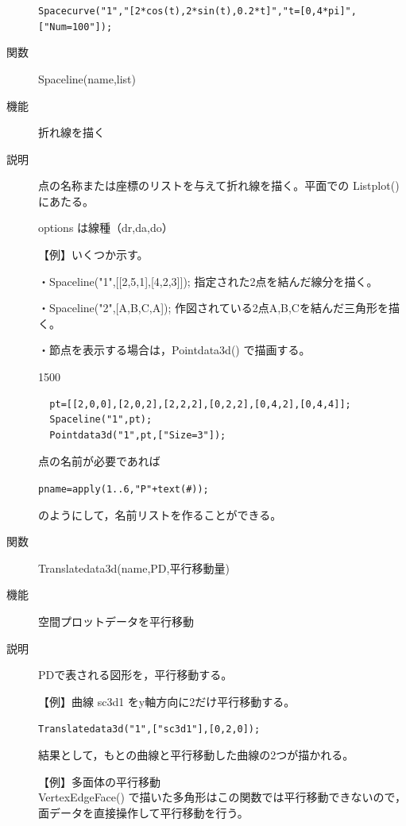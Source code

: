 \documentclass[papersize,a4paper,12pt,uplatex]{jsarticle}
\begin{document}
\begin{description}
\verb|Spacecurve("1","[2*cos(t),2*sin(t),0.2*t]","t=[0,4*pi]",["Num=100"]);|
    
\vspace{\baselineskip}
 \begin{center}  \end{center}

\hypertarget{spaceline}{}
\item[関数]  Spaceline(name,list)
\item[機能]  折れ線を描く
\item[説明]  点の名称または座標のリストを与えて折れ線を描く。平面での Listplot() にあたる。

options は線種（dr,da,do）

\vspace{\baselineskip}
【例】いくつか示す。

・Spaceline("1",[[2,5,1],[4,2,3]]);   指定された2点を結んだ線分を描く。

・Spaceline("2",[A,B,C,A]);  作図されている2点A,B,Cを結んだ三角形を描く。


・節点を表示する場合は，Pointdata3d() で描画する。

\begin{layer}{150}{0}
\end{layer}
\begin{verbatim}
  pt=[[2,0,0],[2,0,2],[2,2,2],[0,2,2],[0,4,2],[0,4,4]];
  Spaceline("1",pt);
  Pointdata3d("1",pt,["Size=3"]);
\end{verbatim}

点の名前が必要であれば

\verb|pname=apply(1..6,"P"+text(#));|

のようにして，名前リストを作ることができる。

\vspace{\baselineskip}
\hypertarget{translatedata3d}{}
\item[関数]  Translatedata3d(name,PD,平行移動量)
\item[機能]  空間プロットデータを平行移動
\item[説明]  PDで表される図形を，平行移動する。

\vspace{\baselineskip}
【例】曲線 sc3d1 をy軸方向に2だけ平行移動する。

\verb|Translatedata3d("1",["sc3d1"],[0,2,0]);|
    
結果として，もとの曲線と平行移動した曲線の2つが描かれる。

\vspace{\baselineskip}
【例】多面体の平行移動\\
VertexEdgeFace() で描いた多角形はこの関数では平行移動できないので，面データを直接操作して平行移動を行う。
  

\end{description}
\end{document}

